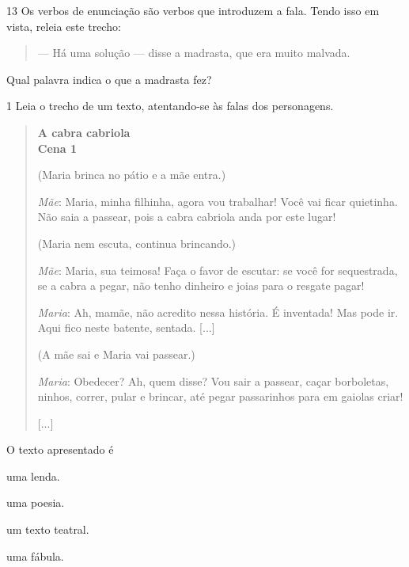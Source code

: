 \num{13} Os verbos de enunciação são verbos que introduzem a fala. Tendo isso em
vista, releia este trecho:

\begin{quote}
--- Há uma solução --- disse a madrasta, que era muito malvada.
\end{quote}


Qual palavra indica o que a madrasta fez?



\num{1} Leia o trecho de um texto, atentando-se às falas dos personagens.

\begin{quote}
\textbf{A cabra cabriola}\\
\textbf{Cena 1}

(Maria brinca no pátio e a mãe entra.)

\emph{Mãe}: Maria, minha filhinha, agora vou trabalhar! Você vai ficar
quietinha. Não saia a passear, pois a cabra cabriola anda por este
lugar!

(Maria nem escuta, continua brincando.)

\emph{Mãe}: Maria, sua teimosa! Faça o favor de escutar: se você for
sequestrada, se a cabra a pegar, não tenho dinheiro e joias para o
resgate pagar!

\emph{Maria}: Ah, mamãe, não acredito nessa história. É inventada! Mas
pode ir. Aqui fico neste batente, sentada. {[}...{]}

(A mãe sai e Maria vai passear.)

\emph{Maria}: Obedecer? Ah, quem disse? Vou sair a passear, caçar
borboletas, ninhos, correr, pular e brincar, até pegar passarinhos para
em gaiolas criar!

{[}...{]}

\end{quote}

O texto apresentado é

\begin{escolha}
\item uma lenda.

\item uma poesia.

\item um texto teatral.

\item uma fábula.
\end{escolha}

